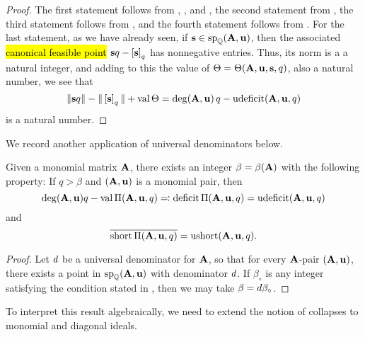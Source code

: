 \documentclass{amsart}
\begin{document}
\begin{proof}  The first statement follows from , , and ,  the second statement from , the third statement follows from ,  and the fourth statement follows from .    For the last statement, as we have already seen, if $\mathbf{s} \in \operatorname{sp}_{\mathbb{Q}}(\mathbf{A}, \mathbf{u})$, then the associated \hl{canonical feasible point} $\mathbf{s}q - \left[ \mathbf{s} \right]_q$ has nonnegative entries.  Thus, its norm is a a natural integer, and adding to this the value of $\Theta = \Theta(\mathbf{A}, \mathbf{u}, \mathbf{s}, q)$, also a natural number, we see that 
\[ \| \mathbf{s}q \| - \| \left[ \mathbf{s} \right]_q \| + \operatorname{val} \Theta = \deg(\mathbf{A}, \mathbf{u}) \, q - \operatorname{udeficit}(\mathbf{A}, \mathbf{u}, q) \] is a natural number.
\end{proof}

We record another application of universal denominators below.

\begin{theorem}
\label{uniform uniform value and image: T}
Given a monomial matrix $\mathbf{A}$, there exists an integer $\beta = \beta(\mathbf{A})$ with the following property\textup:
If $q > \beta$ and $(\mathbf{A}, \mathbf{u})$ is a monomial pair, then
\[  \operatorname{deg}(\mathbf{A},\mathbf{u}) q - \operatorname{val} \Pi(\mathbf{A}, \mathbf{u}, q) \eqqcolon \operatorname{deficit} \Pi(\mathbf{A}, \mathbf{u}, q) = \operatorname{udeficit}(\mathbf{A}, \mathbf{u}, q) \]
and
\[  \overline{ \operatorname{short} \Pi(\mathbf{A}, \mathbf{u}, q)} = \operatorname{ushort} (\mathbf{A}, \mathbf{u}, q).\]
\end{theorem}

\begin{proof}
   Let $d$ be a universal denominator for $\mathbf{A}$, so that for every $\mathbf{A}$-pair $(\mathbf{A}, \mathbf{u})$, there exists a point in $\operatorname{sp}_{\mathbb{Q}}(\mathbf{A}, \mathbf{u})$ with denominator $d$.
   If $\beta_{\circ}$  is any integer satisfying the condition stated in , then we may take $\beta = d \beta_{\circ}$.
\end{proof}

To interpret this result algebraically, we need to extend the notion of collapses to monomial and diagonal ideals.
\end{document}
